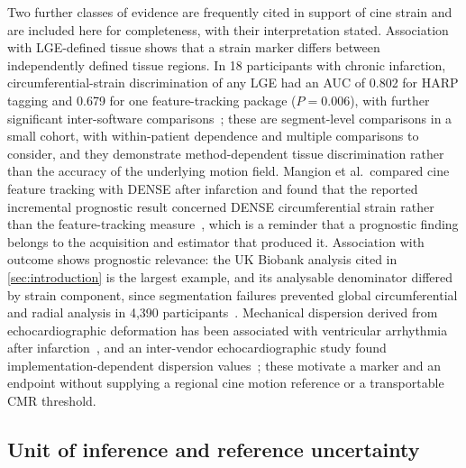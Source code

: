 Two further classes of evidence are frequently cited in support of cine strain and are included here
for completeness, with their interpretation stated. Association with LGE-defined tissue shows that a
strain marker differs between independently defined tissue regions. In 18 participants with chronic
infarction, circumferential-strain discrimination of any LGE had an AUC of 0.802 for HARP tagging
and 0.679 for one feature-tracking package ($P=0.006$), with further significant inter-software
comparisons~\citep[Fig.~7]{militaru2021}; these are segment-level comparisons in a small cohort, with
within-patient dependence and multiple comparisons to consider, and they demonstrate
method-dependent tissue discrimination rather than the accuracy of the underlying motion field.
Mangion et al.\ compared cine feature tracking with DENSE after infarction and found that the
reported incremental prognostic result concerned DENSE circumferential strain rather than the
feature-tracking measure~\citep{mangion2019}, which is a reminder that a prognostic finding belongs
to the acquisition and estimator that produced it. Association with outcome shows prognostic
relevance: the UK Biobank analysis cited in
\cref{sec:introduction} is the largest example, and its analysable denominator differed by strain
component, since segmentation failures prevented global circumferential and radial analysis in 4,390
participants~\citep{chadalavada2024}. Mechanical dispersion derived from echocardiographic
deformation has been associated with ventricular arrhythmia after infarction~\citep{haugaa2010}, and
an inter-vendor echocardiographic study found implementation-dependent dispersion
values~\citep{appadurai2022}; these motivate a marker and an endpoint without supplying a regional
cine motion reference or a transportable CMR threshold.

\subsection{Unit of inference and reference uncertainty}\label{sec:unit}

